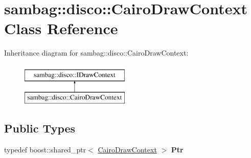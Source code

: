 \hypertarget{classsambag_1_1disco_1_1_cairo_draw_context}{
\section{sambag::disco::CairoDrawContext Class Reference}
\label{classsambag_1_1disco_1_1_cairo_draw_context}
}
Inheritance diagram for sambag::disco::CairoDrawContext:\begin{figure}[H]
\begin{center}
\leavevmode
\includegraphics[height=2.000000cm]{classsambag_1_1disco_1_1_cairo_draw_context}
\end{center}
\end{figure}
\subsection*{Public Types}
\begin{DoxyCompactItemize}
\item 
\hypertarget{classsambag_1_1disco_1_1_cairo_draw_context_ae460e666f64b0a906c8b2d73c228b24f}{
typedef boost::shared\_\-ptr$<$ \hyperlink{classsambag_1_1disco_1_1_cairo_draw_context}{CairoDrawContext} $>$ {\bfseries Ptr}}
\label{classsambag_1_1disco_1_1_cairo_draw_context_ae460e666f64b0a906c8b2d73c228b24f}

\end{DoxyCompactItemize}
